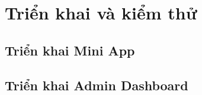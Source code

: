 
\chapter{Triển khai và kiểm thử}
\label{ch:trien-khai}


\section{Triển khai Mini App}
\label{sec:trien-khai-miniapp}

\section{Triển khai Admin Dashboard}
\label{sec:trien-khai-admin}

